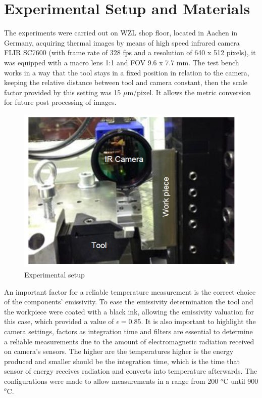	\section{Experimental Setup and Materials}
	\label{sec:exSetup}

	The experiments were carried out on WZL shop floor, located in Aachen in Germany, acquiring thermal images by means of high speed infrared camera FLIR SC7600 (with frame rate of 328 fps and a resolution of 640 x 512 pixels), it was equipped with a macro lens 1:1 and FOV 9.6 x 7.7 mm. The test bench works in a way that the tool stays in a fixed position in relation to the camera, keeping the relative distance between tool and camera constant, then the scale factor provided by this setting was 15 $\mu$m/pixel. It allows the metric conversion for future post processing of images.

	\begin{figure}[H]
		\centering
		\captionsetup{justification=centering}
		\includegraphics[scale = 0.5]{Cap3/exsetup.png}
		\caption{Experimental setup \cite{augspurger2016experimental}}
		\label{fig:exinfrared}
	\end{figure}

	An important factor for a reliable temperature measurement is the correct choice of the components' emissivity. To ease the emissivity determination the tool and the workpiece were coated with a black ink, allowing the emissivity valuation for this case, which provided a value of $\epsilon = 0.85$. It is also important to highlight the camera settings, factors as integration time and filters are essential to determine a reliable measurements due to the amount of electromagnetic radiation received on camera's sensors. The higher are the temperatures higher is the energy produced and smaller should be the integration time, which is the time that sensor of energy receives radiation and converts into temperature afterwards. The configurations were made to allow measurements in a range from 200 $^{o}$C until 900 $^{o}$C.
	
